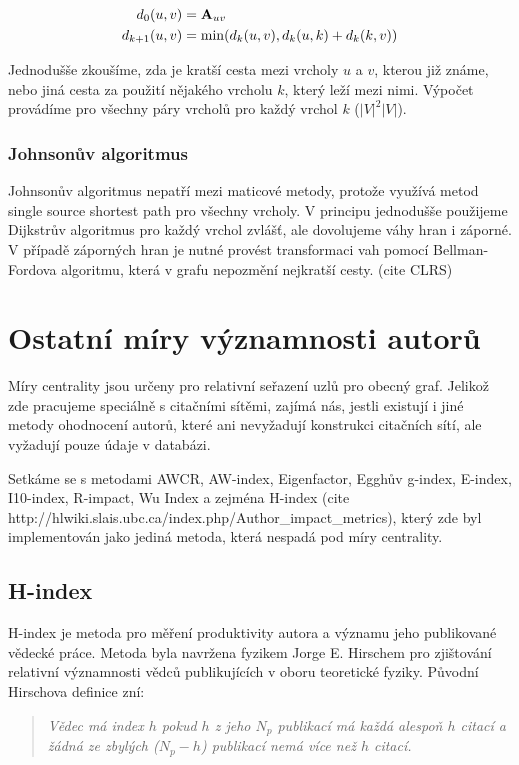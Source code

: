 \documentclass{bakalarka}
\begin{document}
\begin{align*}
d_0(u, v) &= {\bf A}_{uv} \\
d_{k + 1}(u, v) &= \min(d_k(u, v), d_k(u, k) + d_k(k, v)) \\
\end{align*}

Jednodušše zkoušíme, zda je kratší cesta mezi vrcholy $u$ a $v$, kterou již
známe, nebo jiná cesta za použití nějakého vrcholu $k$, který leží mezi nimi.
Výpočet provádíme pro všechny páry vrcholů pro každý vrchol $k$ ($|V|^2 |V|$).

\subsubsection{Johnsonův algoritmus}
Johnsonův algoritmus nepatří mezi maticové metody, protože využívá
metod single source shortest path pro všechny vrcholy. V principu jednodušše
použijeme Dijkstrův algoritmus pro každý vrchol zvlášť, ale dovolujeme váhy
hran i záporné. V případě záporných hran je nutné provést transformaci vah
pomocí Bellman-Fordova algoritmu, která v grafu nepozmění nejkratší cesty. 
(cite CLRS)


\section{Ostatní míry významnosti autorů}
Míry centrality jsou určeny pro relativní seřazení uzlů pro obecný graf.
Jelikož zde pracujeme speciálně s citačními sítěmi, zajímá nás, jestli existují
i jiné metody ohodnocení autorů, které ani nevyžadují konstrukci citačních
sítí, ale vyžadují pouze údaje v databázi.

Setkáme se s metodami AWCR, AW-index, Eigenfactor, Egghův g-index, E-index,
I10-index, R-impact, Wu Index a zejména H-index (cite http://hlwiki.slais.ubc.ca/index.php/Author\_impact\_metrics), který zde byl implementován
jako jediná metoda, která nespadá pod míry centrality.
\subsection{H-index}
H-index je metoda pro měření produktivity autora a významu jeho publikované
vědecké práce.  Metoda byla navržena fyzikem Jorge E. Hirschem pro zjištování
relativní významnosti vědců publikujících v oboru teoretické fyziky. Původní
Hirschova definice zní:

\begin{quote}\textit{
Vědec má index $h$ pokud $h$ z jeho $N_p$ publikací má každá alespoň $h$ citací
a žádná ze zbylých ($N_p - h$) publikací nemá více než $h$ citací.
}
\end{quote}
\end{document}
